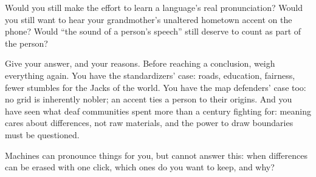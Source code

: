 Would you still make the effort to learn a language's real pronunciation? Would you still want to hear your grandmother's unaltered hometown accent on the phone? Would ``the sound of a person's speech'' still deserve to count as part of the person?

Give your answer, and your reasons. Before reaching a conclusion, weigh everything again. You have the standardizers' case: roads, education, fairness, fewer stumbles for the Jacks of the world. You have the map defenders' case too: no grid is inherently nobler; an accent ties a person to their origins. And you have seen what deaf communities spent more than a century fighting for: meaning cares about differences, not raw materials, and the power to draw boundaries must be questioned.

Machines can pronounce things for you, but cannot answer this: when differences can be erased with one click, which ones do you want to keep, and why?
